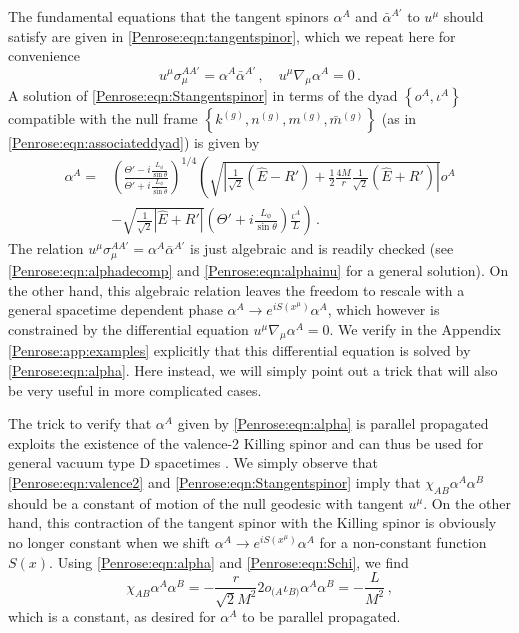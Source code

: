 The fundamental equations that the tangent spinors $\alpha^A$ and $\bar{\alpha}^{A'}$ to $u^{\mu}$  should satisfy are given in \eqref{Penrose:eqn:tangentspinor}, which we repeat here for convenience
\begin{equation}\label{Penrose:eqn:Stangentspinor}
u^{\mu} \sigma_{\mu}^{AA'} = \alpha^A \bar{\alpha}^{A'} \, , \quad u^{\mu} \nabla_{\mu} \alpha^A = 0 \, .
\end{equation}
A solution of \eqref{Penrose:eqn:Stangentspinor} in terms of the dyad $\left\lbrace o^A , \iota^A \right\rbrace$ compatible with the null frame $\left\lbrace  k^{(g)},  n^{(g)}, m^{(g)}, \bar{m}^{(g)}\right \rbrace$ (as in \eqref{Penrose:eqn:associateddyad}) is given by
\begin{equation}\label{Penrose:eqn:alpha}
\begin{aligned}
\alpha^A = & \left(\frac{\Theta'-i \frac{L_{\phi}}{\sin{\theta}}}{\Theta'+i \frac{L_{\phi}}{\sin{\theta}}}\right)^{1/4}\left(\sqrt{\left|\frac{1}{\sqrt{2}}\left(\hat{E} - R'\right)+ \frac{1}{2}\frac{4M}{r}\frac{1}{\sqrt{2}}\left(\hat{E} + R'\right)\right|}o^A  \right. \\  &- \left.\sqrt{\frac{1}{\sqrt{2}}\left|\hat{E} + R'\right|} \left(\Theta'+i \frac{L_{\phi}}{\sin{\theta}}\right)\frac{\iota^A}{L}  \right)\, .
\end{aligned}
\end{equation}
The relation $u^{\mu} \sigma_{\mu}^{AA'} = \alpha^A \bar{\alpha}^{A'}$ is just algebraic and is readily checked (see \eqref{Penrose:eqn:alphadecomp} and \eqref{Penrose:eqn:alphainu} for a general solution). On the other hand, this algebraic relation leaves the freedom to rescale with a general spacetime dependent phase $\alpha^A \to e^{i S(x^{\mu})} \alpha^A$, which however is constrained by the differential equation $u^{\mu} \nabla_{\mu} \alpha^A = 0$. We verify in the Appendix \ref{Penrose:app:examples} explicitly that this differential equation is solved by \eqref{Penrose:eqn:alpha}. Here  instead, we will simply point out a trick that will also be very useful in more complicated cases. 

The trick to verify that $\alpha^A $ given by \eqref{Penrose:eqn:alpha} is parallel propagated exploits the existence of the valence-2 Killing spinor and can thus be used for general vacuum type D spacetimes \cite{Walker:1970un}. We simply observe that \eqref{Penrose:eqn:valence2} and \eqref{Penrose:eqn:Stangentspinor} imply that $\chi_{AB} \alpha^A \alpha^B$ should be a constant of motion of the null geodesic with tangent $u^{\mu}$. On the other hand, this contraction of the tangent spinor with the Killing spinor is obviously no longer constant when we shift $\alpha^A \to e^{i S(x^{\mu})} \alpha^A$ for a non-constant function $S(x)$. Using \eqref{Penrose:eqn:alpha} and \eqref{Penrose:eqn:Schi}, we find
\begin{equation}\label{Penrose:eqn:Skillingspinorconserved}
\chi_{AB} \alpha^A \alpha^B =  -\frac{r}{\sqrt{2} M^2} 2 o_{(A} \iota_{B)}\alpha^A \alpha^B = - \frac{L}{M^2} \, ,
\end{equation}
which is a constant, as desired for $\alpha^A$ to be parallel propagated. 

